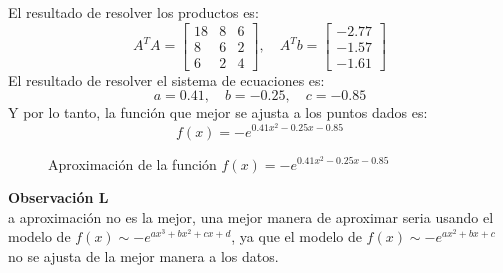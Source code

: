 \documentclass{article}
\newenvironment{remark}[2][Observación]
    { \begin{mdframed}[backgroundcolor=gray!10] \textbf{#1 #2} \\}
    {  \end{mdframed}}
\begin{document}
El resultado de resolver los productos es:
\begin{equation}
    A^TA = \begin{bmatrix}
        18 & 8 & 6 \\
        8 & 6 & 2 \\
        6 & 2 & 4
    \end{bmatrix}, \quad A^Tb = \begin{bmatrix}
        -2.77 \\
        -1.57 \\
        -1.61
    \end{bmatrix}
\end{equation}
El resultado de resolver el sistema de ecuaciones es:
\begin{equation}
    a = 0.41, \quad b = -0.25, \quad c = -0.85
\end{equation}
Y por lo tanto, la función que mejor se ajusta a los puntos dados es:
\begin{equation}
    f(x) = -e^{0.41x^2 - 0.25x - 0.85}
\end{equation}
\begin{figure}[h]
    \centering
    \caption{Aproximación de la función \( f(x) = -e^{0.41x^2 - 0.25x - 0.85} \)}
    \label{fig:myplot5}
\end{figure}
\begin{remark}
    La aproximación no es la mejor, una mejor manera de aproximar seria usando el modelo de $f(x) \sim -e^{ax^3+bx^2+cx+d}$, ya que el modelo de $f(x) \sim -e^{ax^2+bx+c}$ no se ajusta de la mejor manera a los datos.    
\end{remark}
\end{document}
